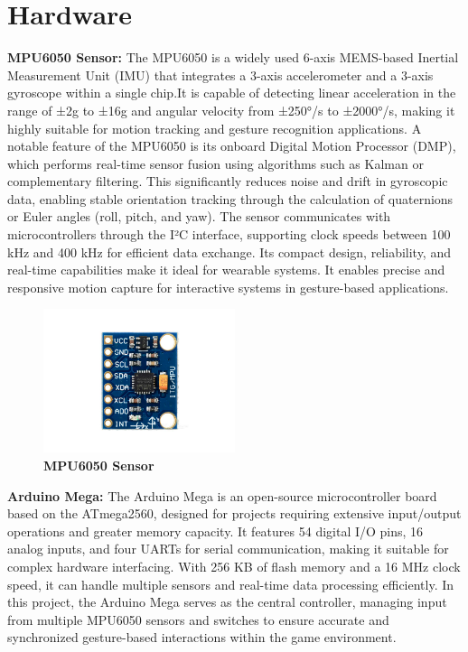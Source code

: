 \section{Hardware}

\textbf{MPU6050 Sensor:} The MPU6050 is a widely used 6-axis MEMS-based Inertial Measurement Unit (IMU) that integrates a 3-axis accelerometer and a 3-axis gyroscope within a single chip.It is capable of detecting linear acceleration in the range of ±2g to ±16g and angular velocity from ±250°/s to ±2000°/s, making it highly suitable for motion tracking and gesture recognition applications. A notable feature of the MPU6050 is its onboard Digital Motion Processor (DMP), which performs real-time sensor fusion using algorithms such as Kalman or complementary filtering. This significantly reduces noise and drift in gyroscopic data, enabling stable orientation tracking through the calculation of quaternions or Euler angles (roll, pitch, and yaw). The sensor communicates with microcontrollers through the I²C interface, supporting clock speeds between 100 kHz and 400 kHz for efficient data exchange. Its compact design, reliability, and real-time capabilities make it ideal for wearable systems. It enables precise and responsive motion capture for interactive systems in gesture-based applications.

\begin{figure}[htbp!]
\centering
\includegraphics[width=0.5\textwidth]{images/3.1.png}
\caption{\textbf{MPU6050 Sensor}}
\label{fig:3.1}
\end{figure}

\vspace{1.5\baselineskip} %

\textbf{Arduino Mega:} The Arduino Mega is an open-source microcontroller board based on the ATmega2560, designed for projects requiring extensive input/output operations and greater memory capacity. It features 54 digital I/O pins, 16 analog inputs, and four UARTs for serial communication, making it suitable for complex hardware interfacing. With 256 KB of flash memory and a 16 MHz clock speed, it can handle multiple sensors and real-time data processing efficiently. In this project, the Arduino Mega serves as the central controller, managing input from multiple MPU6050 sensors and switches to ensure accurate and synchronized gesture-based interactions within the game environment.

